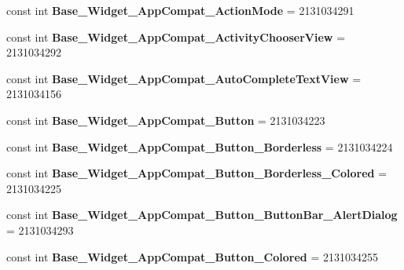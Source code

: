\begin{DoxyCompactItemize}
\item 
\hypertarget{classClient_1_1Droid_1_1Resource_1_1Style_af652ce779a5a4fbf3ee8397ed69b80fe}{}const int {\bfseries Base\+\_\+\+Widget\+\_\+\+App\+Compat\+\_\+\+Action\+Mode} = 2131034291\label{classClient_1_1Droid_1_1Resource_1_1Style_af652ce779a5a4fbf3ee8397ed69b80fe}

\item 
\hypertarget{classClient_1_1Droid_1_1Resource_1_1Style_aebd161c1fb2fc10cc5d2e94c12c74f73}{}const int {\bfseries Base\+\_\+\+Widget\+\_\+\+App\+Compat\+\_\+\+Activity\+Chooser\+View} = 2131034292\label{classClient_1_1Droid_1_1Resource_1_1Style_aebd161c1fb2fc10cc5d2e94c12c74f73}

\item 
\hypertarget{classClient_1_1Droid_1_1Resource_1_1Style_a3c48c41d2f2b4e6781d57b4fb17cf15c}{}const int {\bfseries Base\+\_\+\+Widget\+\_\+\+App\+Compat\+\_\+\+Auto\+Complete\+Text\+View} = 2131034156\label{classClient_1_1Droid_1_1Resource_1_1Style_a3c48c41d2f2b4e6781d57b4fb17cf15c}

\item 
\hypertarget{classClient_1_1Droid_1_1Resource_1_1Style_ab9378a58831b78e6633ca47ece81e460}{}const int {\bfseries Base\+\_\+\+Widget\+\_\+\+App\+Compat\+\_\+\+Button} = 2131034223\label{classClient_1_1Droid_1_1Resource_1_1Style_ab9378a58831b78e6633ca47ece81e460}

\item 
\hypertarget{classClient_1_1Droid_1_1Resource_1_1Style_a411e8e2193bdd969d7533f36b7b6616a}{}const int {\bfseries Base\+\_\+\+Widget\+\_\+\+App\+Compat\+\_\+\+Button\+\_\+\+Borderless} = 2131034224\label{classClient_1_1Droid_1_1Resource_1_1Style_a411e8e2193bdd969d7533f36b7b6616a}

\item 
\hypertarget{classClient_1_1Droid_1_1Resource_1_1Style_a98086c95d5f3837635cb86ac93283a04}{}const int {\bfseries Base\+\_\+\+Widget\+\_\+\+App\+Compat\+\_\+\+Button\+\_\+\+Borderless\+\_\+\+Colored} = 2131034225\label{classClient_1_1Droid_1_1Resource_1_1Style_a98086c95d5f3837635cb86ac93283a04}

\item 
\hypertarget{classClient_1_1Droid_1_1Resource_1_1Style_a686a193e81d1a958b25420afc13ff14d}{}const int {\bfseries Base\+\_\+\+Widget\+\_\+\+App\+Compat\+\_\+\+Button\+\_\+\+Button\+Bar\+\_\+\+Alert\+Dialog} = 2131034293\label{classClient_1_1Droid_1_1Resource_1_1Style_a686a193e81d1a958b25420afc13ff14d}

\item 
\hypertarget{classClient_1_1Droid_1_1Resource_1_1Style_a2de43f6cce4114fd69a4040589d1eb62}{}const int {\bfseries Base\+\_\+\+Widget\+\_\+\+App\+Compat\+\_\+\+Button\+\_\+\+Colored} = 2131034255\label{classClient_1_1Droid_1_1Resource_1_1Style_a2de43f6cce4114fd69a4040589d1eb62}


\end{DoxyCompactItemize}
